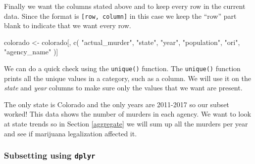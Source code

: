 \documentclass[
]{krantz}
\makeatletter
\newenvironment{Shaded}{\begin{snugshade}}{\end{snugshade}}
\newcommand{\CommentTok}[1]{\textcolor[rgb]{0.37,0.37,0.37}{\textit{#1}}}
\newcommand{\FunctionTok}[1]{\textcolor[rgb]{0,0,0}{#1}}
\newcommand{\NormalTok}[1]{#1}
\newcommand{\OtherTok}[1]{\textcolor[rgb]{0.37,0.37,0.37}{#1}}
\newcommand{\SpecialCharTok}[1]{\textcolor[rgb]{0,0,0}{#1}}
\newcommand{\StringTok}[1]{\textcolor[rgb]{0.5,0.5,0.5}{#1}}
\newenvironment{kframe}{%
\medskip{}
\setlength{\fboxsep}{.8em}
 \def\at@end@of@kframe{}%
 \ifinner\ifhmode%
  \def\at@end@of@kframe{\end{minipage}}%
  \begin{minipage}{\columnwidth}%
 \fi\fi%
 \def\FrameCommand##1{\hskip\@totalleftmargin \hskip-\fboxsep
 \colorbox{shadecolor}{##1}\hskip-\fboxsep
     \hskip-\linewidth \hskip-\@totalleftmargin \hskip\columnwidth}%
 \MakeFramed {\advance\hsize-\width
   \@totalleftmargin\z@ \linewidth\hsize
   \@setminipage}}%
 {\par\unskip\endMakeFramed%
 \at@end@of@kframe}
\renewenvironment{Shaded}{\begin{kframe}}{\end{kframe}}
\makeatother
\begin{document}
Finally we want the columns stated above and to keep every
row in the current data. Since the format is
\texttt{{[}row,\ column{]}} in this case we keep the ``row''
part blank to indicate that we want every row.

\begin{Shaded}
\begin{Highlighting}[]
\NormalTok{colorado }\OtherTok{\textless{}{-}}\NormalTok{ colorado[, }\FunctionTok{c}\NormalTok{(}
  \StringTok{"actual\_murder"}\NormalTok{,}
  \StringTok{"state"}\NormalTok{,}
  \StringTok{"year"}\NormalTok{,}
  \StringTok{"population"}\NormalTok{,}
  \StringTok{"ori"}\NormalTok{,}
  \StringTok{"agency\_name"}
\NormalTok{)]}
\end{Highlighting}
\end{Shaded}

We can do a quick check using the \texttt{unique()}
function. The \texttt{unique()} function prints all the
unique values in a category, such as a column. We will use
it on the \emph{state} and \emph{year} columns to make sure
only the values that we want are present.

\begin{Shaded}
\end{Shaded}

\begin{Shaded}
\end{Shaded}

The only state is Colorado and the only years are 2011-2017
so our subset worked! This data shows the number of murders
in each agency. We want to look at state trends so in
Section \ref{aggregate} we will sum up all the murders per
year and see if marijuana legalization affected it.

\hypertarget{subsetting-using-dplyr}{%
\subsubsection{\texorpdfstring{Subsetting using
\texttt{dplyr}}{Subsetting using dplyr}}\label{subsetting-using-dplyr}}
\end{document}
